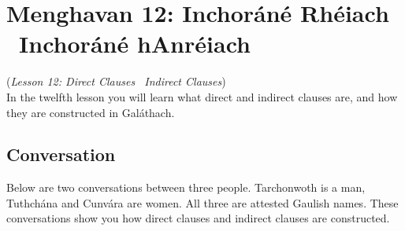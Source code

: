 \section{Menghavan 12: Inchor\'{a}n\'{e} Rh\'{e}iach \textendash\ Inchor\'{a}n\'{e} hAnr\'{e}iach}
(\textit{Lesson 12: Direct Clauses \textendash\ Indirect Clauses})\\

In the twelfth lesson you will learn what direct and indirect clauses are, and how they are constructed in Gal\'{a}thach.

\subsection{Conversation}

Below are two conversations between three people. Tarchonwoth is a man, Tuthch\'{a}na and Cunv\'{a}ra are women. All three are attested Gaulish names. These conversations show you how direct clauses and indirect clauses are constructed.


